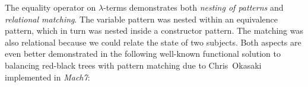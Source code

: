 %
%

The equality operator on $\lambda$-terms demonstrates both \emph{nesting of patterns} 
and \emph{relational matching}. The variable pattern was nested within an equivalence 
pattern, which in turn was nested inside a constructor pattern. 
The matching was also relational because we could relate the state of two 
subjects. Both aspects are even better demonstrated in the following well-known 
functional solution to balancing red-black trees with pattern matching due to 
Chris~Okasaki~\cite[]{okasaki1999purely} implemented in 
\emph{Mach7}:

